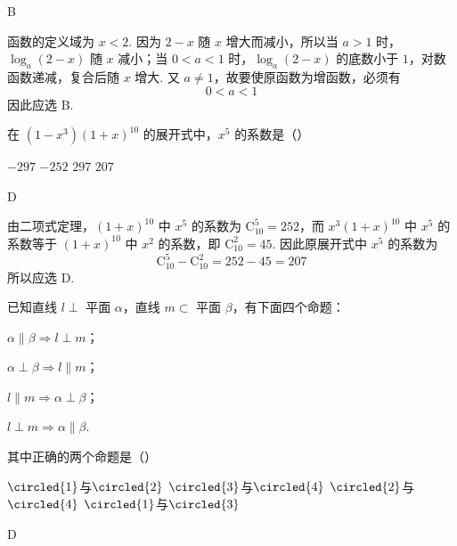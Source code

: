 \begin{answer}
B
\end{answer}

\begin{solution}
函数的定义域为 \(x<2\). 因为 \(2-x\) 随 \(x\) 增大而减小，所以当 \(a>1\) 时，\(\log_a(2-x)\) 随 \(x\) 减小；当 \(0<a<1\) 时，\(\log_a(2-x)\) 的底数小于 \(1\)，对数函数递减，复合后随 \(x\) 增大. 又 \(a\ne1\)，故要使原函数为增函数，必须有
\[
0<a<1
\]
因此应选 B.
\end{solution}

\begin{problem}
在 \((1 - x^{3})(1 + x)^{10}\) 的展开式中，\(x^{5}\) 的系数是（\quad）

\choices
    {\(-297\)}
    {\(-252\)}
    {\(297\)}
    {\(207\)}
\end{problem}

\begin{answer}
D
\end{answer}

\begin{solution}
由二项式定理，\((1+x)^{10}\) 中 \(x^5\) 的系数为 \(\mathrm C_{10}^{5}=252\)，而 \(x^3(1+x)^{10}\) 中 \(x^5\) 的系数等于 \((1+x)^{10}\) 中 \(x^2\) 的系数，即 \(\mathrm C_{10}^{2}=45\). 因此原展开式中 \(x^5\) 的系数为
\[
\mathrm C_{10}^{5}-\mathrm C_{10}^{2}=252-45=207
\]
所以应选 D.
\end{solution}

\begin{problem}
已知直线 \(l \perp\) 平面 \(\alpha\)，直线 \(m \subset\) 平面 \(\beta\)，有下面四个命题：

\begin{circlelist}
\item \(\alpha \parallel \beta \Rightarrow l \perp m\)；
\item \(\alpha \perp \beta \Rightarrow l \parallel m\)；
\item \(l \parallel m \Rightarrow \alpha \perp \beta\)；
\item \(l \perp m \Rightarrow \alpha \parallel \beta\).
\end{circlelist}

其中正确的两个命题是（\quad）

\choices
    {\(\circled{1}\)与\(\circled{2}\)}
    {\(\circled{3}\)与\(\circled{4}\)}
    {\(\circled{2}\)与\(\circled{4}\)}
    {\(\circled{1}\)与\(\circled{3}\)}
\end{problem}

\begin{answer}
D
\end{answer}

